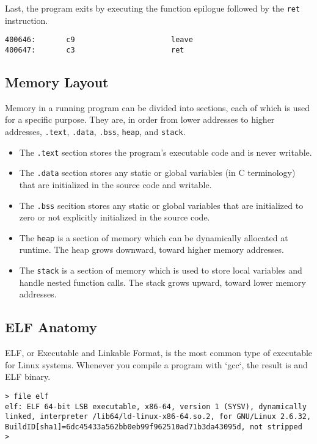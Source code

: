 Last, the program exits by executing the function epilogue followed by the
\texttt{ret} instruction.
\begin{lstlisting}
400646:       c9                      leave  
400647:       c3                      ret    
\end{lstlisting}

\subsection{Memory Layout}
Memory in a running program can be divided into sections, each of which is used
for a specific purpose. They are, in order from lower addresses to higher
addresses, \texttt{.text}, \texttt{.data}, \texttt{.bss}, \texttt{heap}, and
\texttt{stack}.

\begin{itemize}
    \item The \texttt{.text} section stores the program's executable code and is
never writable.
    \item The \texttt{.data} section stores any static or global variables (in C
terminology) that are initialized in the source code and writable.
    \item The \texttt{.bss} secition stores any static or global variables that
are initialized to zero or not explicitly initialized in the source code.
    \item The \texttt{heap} is a section of memory which can be dynamically
allocated at runtime. The heap grows downward, toward higher memory addresses.
    \item The \texttt{stack} is a section of memory which is used to store
local variables and handle nested function calls. The stack grows upward, toward
lower memory addresses.
\end{itemize}

\subsection{ELF Anatomy}
ELF, or Executable and Linkable Format, is the most common type of executable
for Linux systems. Whenever you compile a program with `gcc`, the result is and
ELF binary.

\begin{lstlisting}
> file elf
elf: ELF 64-bit LSB executable, x86-64, version 1 (SYSV), dynamically linked, interpreter /lib64/ld-linux-x86-64.so.2, for GNU/Linux 2.6.32, BuildID[sha1]=6dc45433a562bb0eb99f962510ad71b3da43095d, not stripped
> 
\end{lstlisting}

